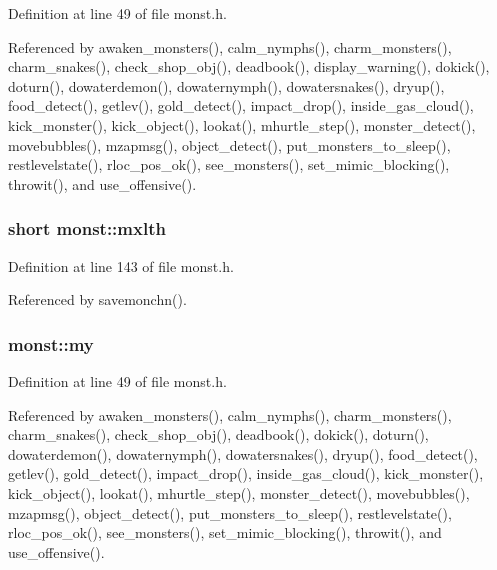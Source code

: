 Definition at line 49 of file monst.\+h.



Referenced by awaken\+\_\+monsters(), calm\+\_\+nymphs(), charm\+\_\+monsters(), charm\+\_\+snakes(), check\+\_\+shop\+\_\+obj(), deadbook(), display\+\_\+warning(), dokick(), doturn(), dowaterdemon(), dowaternymph(), dowatersnakes(), dryup(), food\+\_\+detect(), getlev(), gold\+\_\+detect(), impact\+\_\+drop(), inside\+\_\+gas\+\_\+cloud(), kick\+\_\+monster(), kick\+\_\+object(), lookat(), mhurtle\+\_\+step(), monster\+\_\+detect(), movebubbles(), mzapmsg(), object\+\_\+detect(), put\+\_\+monsters\+\_\+to\+\_\+sleep(), restlevelstate(), rloc\+\_\+pos\+\_\+ok(), see\+\_\+monsters(), set\+\_\+mimic\+\_\+blocking(), throwit(), and use\+\_\+offensive().

\hypertarget{structmonst_a6c24439d98c9580ee2a3918008801ac2}{
\subsubsection[{mxlth}]{\setlength{\rightskip}{0pt plus 5cm}short monst\+::mxlth}}\label{structmonst_a6c24439d98c9580ee2a3918008801ac2}


Definition at line 143 of file monst.\+h.



Referenced by savemonchn().

\hypertarget{structmonst_a0b969d9b6af5b55393f6acfe508c6f08}{
\subsubsection[{my}]{ monst\+::my}}\label{structmonst_a0b969d9b6af5b55393f6acfe508c6f08}


Definition at line 49 of file monst.\+h.



Referenced by awaken\+\_\+monsters(), calm\+\_\+nymphs(), charm\+\_\+monsters(), charm\+\_\+snakes(), check\+\_\+shop\+\_\+obj(), deadbook(), dokick(), doturn(), dowaterdemon(), dowaternymph(), dowatersnakes(), dryup(), food\+\_\+detect(), getlev(), gold\+\_\+detect(), impact\+\_\+drop(), inside\+\_\+gas\+\_\+cloud(), kick\+\_\+monster(), kick\+\_\+object(), lookat(), mhurtle\+\_\+step(), monster\+\_\+detect(), movebubbles(), mzapmsg(), object\+\_\+detect(), put\+\_\+monsters\+\_\+to\+\_\+sleep(), restlevelstate(), rloc\+\_\+pos\+\_\+ok(), see\+\_\+monsters(), set\+\_\+mimic\+\_\+blocking(), throwit(), and use\+\_\+offensive().

